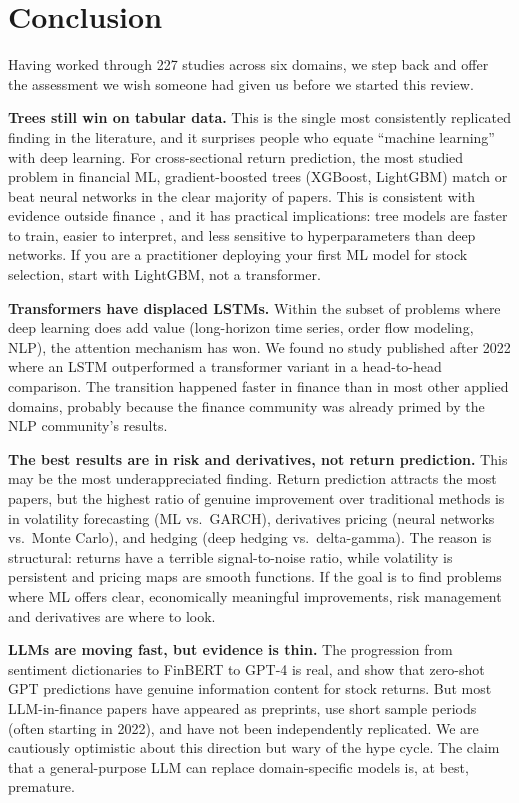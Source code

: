 \section{Conclusion}\label{sec:conclusion}

Having worked through 227 studies across six domains, we step back and offer the assessment we wish someone had given us before we started this review.

\textbf{Trees still win on tabular data.} This is the single most consistently replicated finding in the literature, and it surprises people who equate ``machine learning'' with deep learning. For cross-sectional return prediction, the most studied problem in financial ML, gradient-boosted trees (XGBoost, LightGBM) match or beat neural networks in the clear majority of papers. This is consistent with evidence outside finance \citep{Grinsztajn2022}, and it has practical implications: tree models are faster to train, easier to interpret, and less sensitive to hyperparameters than deep networks. If you are a practitioner deploying your first ML model for stock selection, start with LightGBM, not a transformer.

\textbf{Transformers have displaced LSTMs.} Within the subset of problems where deep learning does add value (long-horizon time series, order flow modeling, NLP), the attention mechanism has won. We found no study published after 2022 where an LSTM outperformed a transformer variant in a head-to-head comparison. The transition happened faster in finance than in most other applied domains, probably because the finance community was already primed by the NLP community's results.

\textbf{The best results are in risk and derivatives, not return prediction.} This may be the most underappreciated finding. Return prediction attracts the most papers, but the highest ratio of genuine improvement over traditional methods is in volatility forecasting (ML vs.\ GARCH), derivatives pricing (neural networks vs.\ Monte Carlo), and hedging (deep hedging vs.\ delta-gamma). The reason is structural: returns have a terrible signal-to-noise ratio, while volatility is persistent and pricing maps are smooth functions. If the goal is to find problems where ML offers clear, economically meaningful improvements, risk management and derivatives are where to look.

\textbf{LLMs are moving fast, but evidence is thin.} The progression from sentiment dictionaries to FinBERT to GPT-4 is real, and \citet{LopezLira2023} show that zero-shot GPT predictions have genuine information content for stock returns. But most LLM-in-finance papers have appeared as preprints, use short sample periods (often starting in 2022), and have not been independently replicated. We are cautiously optimistic about this direction but wary of the hype cycle. The claim that a general-purpose LLM can replace domain-specific models is, at best, premature.

